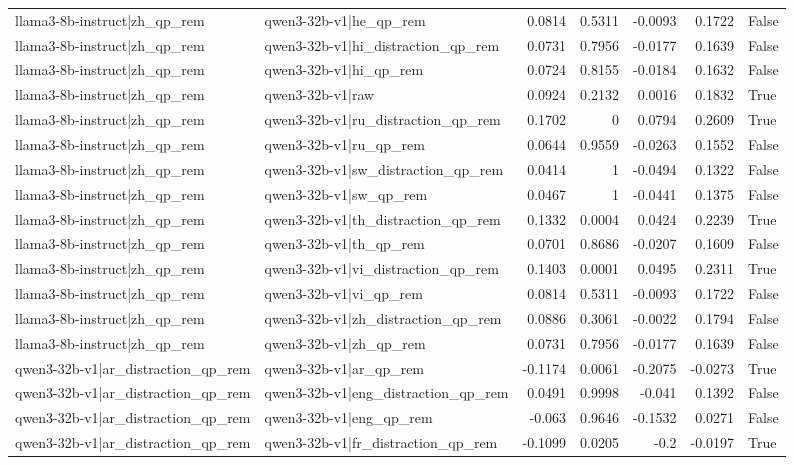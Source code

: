 \begin{table}
\begin{tabular}{l l r r r r l}
llama3-8b-instruct|zh_qp_rem & qwen3-32b-v1|he_qp_rem & 0.0814 & 0.5311 & -0.0093 & 0.1722 & False \\
llama3-8b-instruct|zh_qp_rem & qwen3-32b-v1|hi_distraction_qp_rem & 0.0731 & 0.7956 & -0.0177 & 0.1639 & False \\
llama3-8b-instruct|zh_qp_rem & qwen3-32b-v1|hi_qp_rem & 0.0724 & 0.8155 & -0.0184 & 0.1632 & False \\
llama3-8b-instruct|zh_qp_rem & qwen3-32b-v1|raw & 0.0924 & 0.2132 & 0.0016 & 0.1832 & True \\
llama3-8b-instruct|zh_qp_rem & qwen3-32b-v1|ru_distraction_qp_rem & 0.1702 & 0 & 0.0794 & 0.2609 & True \\
llama3-8b-instruct|zh_qp_rem & qwen3-32b-v1|ru_qp_rem & 0.0644 & 0.9559 & -0.0263 & 0.1552 & False \\
llama3-8b-instruct|zh_qp_rem & qwen3-32b-v1|sw_distraction_qp_rem & 0.0414 & 1 & -0.0494 & 0.1322 & False \\
llama3-8b-instruct|zh_qp_rem & qwen3-32b-v1|sw_qp_rem & 0.0467 & 1 & -0.0441 & 0.1375 & False \\
llama3-8b-instruct|zh_qp_rem & qwen3-32b-v1|th_distraction_qp_rem & 0.1332 & 0.0004 & 0.0424 & 0.2239 & True \\
llama3-8b-instruct|zh_qp_rem & qwen3-32b-v1|th_qp_rem & 0.0701 & 0.8686 & -0.0207 & 0.1609 & False \\
llama3-8b-instruct|zh_qp_rem & qwen3-32b-v1|vi_distraction_qp_rem & 0.1403 & 0.0001 & 0.0495 & 0.2311 & True \\
llama3-8b-instruct|zh_qp_rem & qwen3-32b-v1|vi_qp_rem & 0.0814 & 0.5311 & -0.0093 & 0.1722 & False \\
llama3-8b-instruct|zh_qp_rem & qwen3-32b-v1|zh_distraction_qp_rem & 0.0886 & 0.3061 & -0.0022 & 0.1794 & False \\
llama3-8b-instruct|zh_qp_rem & qwen3-32b-v1|zh_qp_rem & 0.0731 & 0.7956 & -0.0177 & 0.1639 & False \\
qwen3-32b-v1|ar_distraction_qp_rem & qwen3-32b-v1|ar_qp_rem & -0.1174 & 0.0061 & -0.2075 & -0.0273 & True \\
qwen3-32b-v1|ar_distraction_qp_rem & qwen3-32b-v1|eng_distraction_qp_rem & 0.0491 & 0.9998 & -0.041 & 0.1392 & False \\
qwen3-32b-v1|ar_distraction_qp_rem & qwen3-32b-v1|eng_qp_rem & -0.063 & 0.9646 & -0.1532 & 0.0271 & False \\
qwen3-32b-v1|ar_distraction_qp_rem & qwen3-32b-v1|fr_distraction_qp_rem & -0.1099 & 0.0205 & -0.2 & -0.0197 & True \\

\end{tabular}
\end{table}
